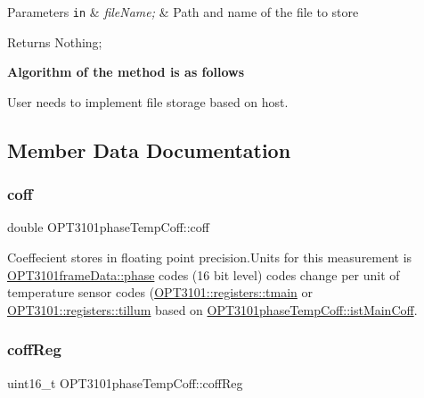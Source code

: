 \begin{DoxyParams}[1]{Parameters}
\mbox{\tt in}  & {\em file\+Name;} & Path and name of the file to store \\
\hline
\end{DoxyParams}
\begin{DoxyReturn}{Returns}
Nothing; 
\end{DoxyReturn}
{\bfseries Algorithm of the method is as follows}
\begin{DoxyItemize}
\item User needs to implement file storage based on host. 
\end{DoxyItemize}

\subsection{Member Data Documentation}
\mbox{\label{class_o_p_t3101phase_temp_coff_a620b60e04178524cfa6a7bf558f1976c}} 
\subsubsection{\texorpdfstring{coff}{coff}}
{\footnotesize\ttfamily double O\+P\+T3101phase\+Temp\+Coff\+::coff}



Coeffecient stores in floating point precision.\+Units for this measurement is \mbox{\hyperlink{class_o_p_t3101frame_data_a4d07c723715856ea9652b3d672d01191}{O\+P\+T3101frame\+Data\+::phase}} codes (16 bit level) codes change per unit of temperature sensor codes (\mbox{\hyperlink{class_o_p_t3101_1_1registers_a3dfd8d81d4cb04d274007deb7c6122fc}{O\+P\+T3101\+::registers\+::tmain}} or \mbox{\hyperlink{class_o_p_t3101_1_1registers_a8a097a41ecdf2b98226c4a3a92121c12}{O\+P\+T3101\+::registers\+::tillum}} based on \mbox{\hyperlink{class_o_p_t3101phase_temp_coff_a1a23b6ee727c71eb59b07bda0c81476b}{O\+P\+T3101phase\+Temp\+Coff\+::ist\+Main\+Coff}}. 

\mbox{\label{class_o_p_t3101phase_temp_coff_ad838e80740244ac22e7e63f6f6f18ab6}} 
\subsubsection{\texorpdfstring{coff\+Reg}{coffReg}}
{\footnotesize\ttfamily uint16\+\_\+t O\+P\+T3101phase\+Temp\+Coff\+::coff\+Reg}



